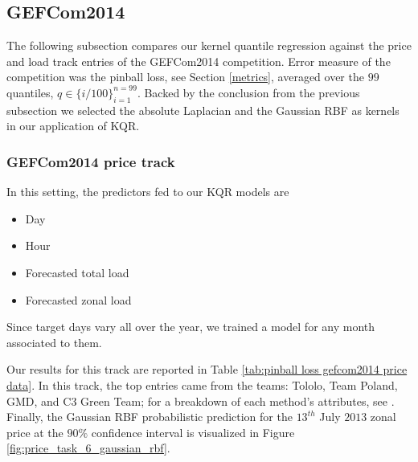 \subsection{GEFCom2014}
The following subsection compares our kernel quantile regression against the price and load track entries of the GEFCom2014 competition.
Error measure of the competition was the pinball loss, see Section \ref{metrics}, averaged over the $99$ quantiles, $q \in \{i/100\}_{i=1}^{n=99}$. Backed by the conclusion from the previous subsection we selected the absolute Laplacian and the Gaussian RBF as kernels in our application of KQR.


\subsubsection{GEFCom2014 price track}
In this setting, the predictors fed to our KQR models are
\begin{itemize}
    \item Day
    \item Hour
    \item Forecasted total load
    \item Forecasted zonal load
\end{itemize}
Since target days vary all over the year, we trained a model for any month associated to them.

Our results for this track are reported in Table \ref{tab:pinball loss gefcom2014 price data}. In this track, the top entries came from the teams: Tololo, Team Poland, GMD, and C3 Green Team; for a breakdown of each method's attributes, see \cite[Table 8]{hong2016probabilistic}. Finally, the Gaussian RBF probabilistic prediction for the $13^{th}$ July $2013$ zonal price at the $90\%$ confidence interval is visualized in Figure \ref{fig:price_task_6_gaussian_rbf}.


